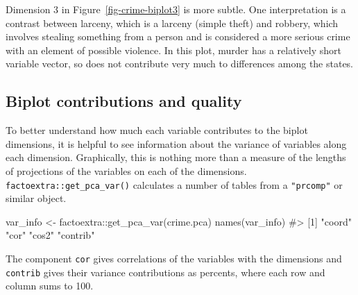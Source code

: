 \documentclass[
  letterpaper,
  10pt,
  krantz2]{krantz}
\makeatletter
\newenvironment{Shaded}{\begin{snugshade}}{\end{snugshade}}
\newcommand{\CommentTok}[1]{\textcolor[rgb]{0.37,0.37,0.37}{#1}}
\newcommand{\FunctionTok}[1]{\textcolor[rgb]{0.28,0.35,0.67}{#1}}
\newcommand{\NormalTok}[1]{\textcolor[rgb]{0.00,0.23,0.31}{#1}}
\newcommand{\OtherTok}[1]{\textcolor[rgb]{0.00,0.23,0.31}{#1}}
\newcommand{\SpecialCharTok}[1]{\textcolor[rgb]{0.37,0.37,0.37}{#1}}
\newenvironment{kframe}{%
  \medskip{}
  \setlength{\fboxsep}{.8em}
  \def\at@end@of@kframe{}%
  \ifinner\ifhmode%
  \def\at@end@of@kframe{\end{minipage}}%
  \begin{minipage}{\columnwidth}%
  \fi\fi%
  \def\FrameCommand##1{\hskip\@totalleftmargin \hskip-\fboxsep
  \colorbox{shadecolor}{##1}\hskip-\fboxsep
      \hskip-\linewidth \hskip-\@totalleftmargin \hskip\columnwidth}%
  \MakeFramed {\advance\hsize-\width
    \@totalleftmargin\z@ \linewidth\hsize
    \@setminipage}}%
{\par\unskip\endMakeFramed%
  \at@end@of@kframe}
\renewenvironment{Shaded}{\begin{kframe}}{\end{kframe}}
\makeatother
\begin{document}
Dimension 3 in Figure~\ref{fig-crime-biplot3} is more subtle. One
interpretation is a contrast between larceny, which is a larceny (simple
theft) and robbery, which involves stealing something from a person and
is considered a more serious crime with an element of possible violence.
In this plot, murder has a relatively short variable vector, so does not
contribute very much to differences among the states.

\hypertarget{biplot-contributions-and-quality}{%
\subsection{Biplot contributions and
quality}\label{biplot-contributions-and-quality}}

To better understand how much each variable contributes to the biplot
dimensions, it is helpful to see information about the variance of
variables along each dimension. Graphically, this is nothing more than a
measure of the lengths of projections of the variables on each of the
dimensions. \texttt{factoextra::get\_pca\_var()} calculates a number of
tables from a \texttt{"prcomp"} or similar object.

\begin{Shaded}
\begin{Highlighting}[]
\NormalTok{var\_info }\OtherTok{\textless{}{-}}\NormalTok{ factoextra}\SpecialCharTok{::}\FunctionTok{get\_pca\_var}\NormalTok{(crime.pca)}
\FunctionTok{names}\NormalTok{(var\_info)}
\CommentTok{\#\textgreater{} [1] "coord"   "cor"     "cos2"    "contrib"}
\end{Highlighting}
\end{Shaded}

The component \texttt{cor} gives correlations of the variables with the
dimensions and \texttt{contrib} gives their variance contributions as
percents, where each row and column sums to 100.
\end{document}

